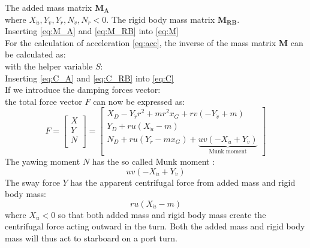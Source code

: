 The added mass matrix $\mathbf{M_A}$
\begin{equation}
    \label{eq:M_A}
    
\end{equation}
where $X_{\dot{u}},Y_{\dot{v}},Y_{\dot{r}},N_{\dot{v}},N_{\dot{r}} < 0$. 
The rigid body mass matrix $\mathbf{M_{RB}}$.
\begin{equation}
    \label{eq:M_RB}
    
\end{equation}
Inserting \autoref{eq:M_A} and \autoref{eq:M_RB} into \autoref{eq:M}
\begin{equation}
    \label{eq:M_expanded}
    
\end{equation}
For the calculation of acceleration \autoref{eq:acc}, the inverse of the mass matrix $\mathbf{M}$ can be calculated as:
\begin{equation}
    \label{eq:M_inv}
    
\end{equation}
with the helper variable $S$:
\begin{equation}
    \label{eq:S}
    
\end{equation}
Inserting \autoref{eq:C_A} and \autoref{eq:C_RB} into \autoref{eq:C}
\begin{equation}
    \label{eq:C_expanded}
    
\end{equation}
If we introduce the damping forces vector:
\begin{equation}
    \label{eq:D}
    
\end{equation}
the total force vector $F$ can now be expressed as:
\begin{equation}
    \label{eq:F_expanded}
F = 
\left[\begin{matrix}
X \\
Y \\
N \\
\end{matrix}\right]
=
\left[\begin{matrix}X_{D} - Y_{\dot{r}} r^{2} + m r^{2} x_{G} + r v \left(- Y_{\dot{v}} + m\right)\\Y_{D} + r u \left(X_{\dot{u}} - m\right)\\N_{D} + r u \left(Y_{\dot{r}} - m x_{G}\right) + \underbrace{u v \left(- X_{\dot{u}} + Y_{\dot{v}}\right)}_{\text{Munk moment}} \end{matrix}\right]
\end{equation}
The yawing moment $N$ has the so called Munk moment \citep{fossenHandbookMarineCraft2011}:
$$
u v \left(- X_{\dot{u}} + Y_{\dot{v}}\right)
$$
The sway force $Y$ has the apparent centrifugal force from added mass and rigid body mass: 
$$r u \left(X_{\dot{u}} - m\right)$$ where $X_{\dot{u}}<0$ so that both added mass and rigid body mass create the centrifugal force acting outward in the turn. Both the added mass and rigid body mass will thus act to starboard on a port turn.
